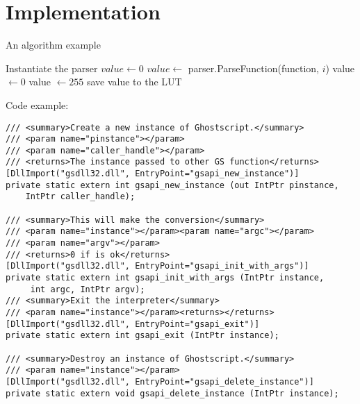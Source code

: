\chapter{Implementation}
An algorithm example
\begin{algorithmic}
	\STATE Instantiate the parser
	\STATE \(value \leftarrow 0\)
	\STATE \(value \leftarrow\) parser.ParseFunction(function, \(i\))
	\STATE value \(\leftarrow 0\)
	\STATE value \(\leftarrow 255\)
	\ENDIF
	\STATE save value to the LUT
	\ENDFOR
\end{algorithmic}

Code example:
\lstset{language=c++}
\begin{lstlisting}
/// <summary>Create a new instance of Ghostscript.</summary>
/// <param name="pinstance"></param>
/// <param name="caller_handle"></param>
/// <returns>The instance passed to other GS function</returns>
[DllImport("gsdll32.dll", EntryPoint="gsapi_new_instance")]
private static extern int gsapi_new_instance (out IntPtr pinstance,
    IntPtr caller_handle);
 
/// <summary>This will make the conversion</summary>
/// <param name="instance"></param><param name="argc"></param>
/// <param name="argv"></param>
/// <returns>0 if is ok</returns>
[DllImport("gsdll32.dll", EntryPoint="gsapi_init_with_args")]
private static extern int gsapi_init_with_args (IntPtr instance,
	 int argc, IntPtr argv);
/// <summary>Exit the interpreter</summary>
/// <param name="instance"></param><returns></returns>
[DllImport("gsdll32.dll", EntryPoint="gsapi_exit")]
private static extern int gsapi_exit (IntPtr instance);
 
/// <summary>Destroy an instance of Ghostscript.</summary>
/// <param name="instance"></param>
[DllImport("gsdll32.dll", EntryPoint="gsapi_delete_instance")]
private static extern void gsapi_delete_instance (IntPtr instance);
\end{lstlisting}